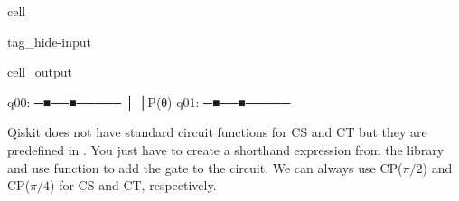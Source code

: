 \documentclass[letterpaper,10pt,english]{jupyterBook}
\begin{document}
\begin{sphinxuseclass}{cell}
\begin{sphinxuseclass}{tag_hide-input}\begin{sphinxVerbatimOutput}

\begin{sphinxuseclass}{cell_output}
\begin{sphinxVerbatim}[commandchars=\\\{\}]

q0\PYGZus{}0: ─■──■─────
       │  │P(θ)
q0\PYGZus{}1: ─■──■─────

\end{sphinxVerbatim}

\end{sphinxuseclass}\end{sphinxVerbatimOutput}

\end{sphinxuseclass}
\end{sphinxuseclass}
\sphinxAtStartPar
Qiskit does not have standard circuit functions for CS and CT but they are predefined in .  You just have to create a shorthand expression from the library and use  function to add the gate to the circuit. We can always use CP(\(\pi/2\)) and CP(\(\pi/4\)) for CS and CT, respectively.
\end{document}
